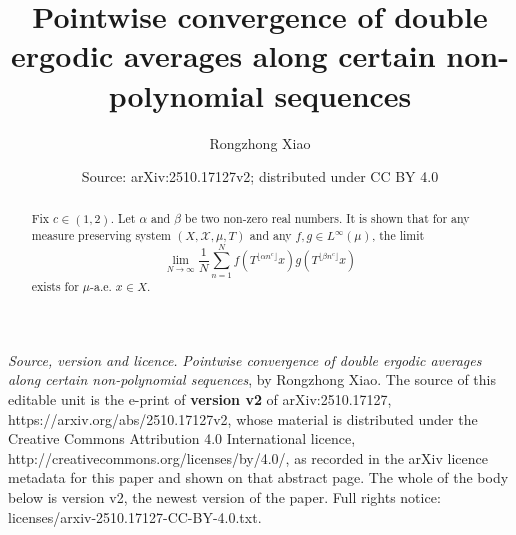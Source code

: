 \documentclass[10pt,a4paper]{amsart}
\def \X {\mathcal{X}}
\numberwithin{equation}{section}
\begin{document}
\title{Pointwise convergence of double ergodic averages along certain non-polynomial sequences}
\author{Rongzhong Xiao}
\date{Source: arXiv:2510.17127v2; distributed under CC BY 4.0}
\begin{abstract}
	Fix $c\in (1,2)$. Let $\alpha$ and $\beta$ be two non-zero real numbers. It is shown that for any measure preserving system $(X,\X,\mu,T)$ and any $f,g\in L^{\infty}(\mu)$, the limit
	\begin{equation*}
	\lim_{N\to\infty}\frac{1}{N}\sum_{n=1}^{N}f(T^{\lfloor \alpha n^c \rfloor}x)g(T^{\lfloor \beta n^c \rfloor}x)
	\end{equation*}
	exists for $\mu$-a.e. $x\in X$.
\end{abstract}


\maketitle
\noindent\emph{Source, version and licence.} \emph{Pointwise convergence of double ergodic averages along certain non-polynomial sequences}, by Rongzhong Xiao. The source of this editable unit is the e-print of \textbf{version v2} of arXiv:2510.17127, https://arxiv.org/abs/2510.17127v2, whose material is distributed under the Creative Commons Attribution 4.0 International licence, http://creativecommons.org/licenses/by/4.0/, as recorded in the arXiv licence metadata for this paper and shown on that abstract page. The whole of the body below is version v2, the newest version of the paper. Full rights notice: licenses/arxiv-2510.17127-CC-BY-4.0.txt.\par\smallskip
\end{document}
